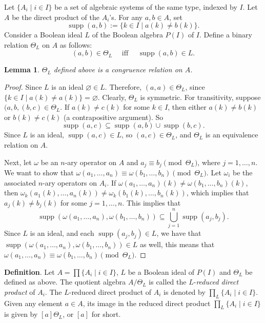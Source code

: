 \documentclass[12pt]{article}
\newtheorem{lem}{Lemma}
\begin{document}
Let $\lbrace A_i\mid i\in I\rbrace$ be a set of algebraic systems of the same type, indexed by $I$.  Let $A$ be the direct product of the $A_i$'s.  For any $a,b\in A$, set $$\operatorname{supp}(a,b):=\lbrace k\in I\mid a(k)\ne b(k)\rbrace.$$  Consider a Boolean ideal $L$ of the Boolean algebra $P(I)$ of $I$.  Define a binary relation $\Theta_L$ on $A$ as follows:
$$(a,b)\in \Theta_L\quad \mbox{ iff }\quad \operatorname{supp}(a,b)\in L.$$

\begin{lem} $\Theta_L$ defined above is a congruence relation on $A$. \end{lem}
\begin{proof}  Since $L$ is an ideal $\varnothing\in L$.  Therefore, $(a,a)\in \Theta_L$, since $\lbrace k\in I\mid a(k)\ne a(k)\rbrace=\varnothing$.  Clearly, $\Theta_L$ is symmetric.  For transitivity, suppose  $(a,b,(b,c)\in \Theta_L$.  If $a(k)\ne c(k)$ for some $k\in I$, then either $a(k)\ne b(k)$ or $b(k)\ne c(k)$ (a contrapositive argument).  So $$\operatorname{supp}(a,c) \subseteq \operatorname{supp}(a,b) \cup \operatorname{supp}(b,c).$$  Since $L$ is an ideal, $\operatorname{supp}(a,c)\in L$, so $(a,c)\in \Theta_L$, and $\Theta_L$ is an equivalence relation on $A$.

Next, let $\omega$ be an $n$-ary operator on $A$ and $a_j\equiv b_j\pmod {\Theta_L}$, where $j=1,\ldots,n$.  We want to show that $\omega(a_1,\ldots,a_n)\equiv \omega(b_1,\ldots,b_n)\pmod {\Theta_L}$.  Let $\omega_i$ be the associated $n$-ary operators on $A_i$.  If $\omega(a_1,\ldots,a_n)(k)\ne \omega(b_1,\ldots,b_n)(k)$, then $\omega_k(a_1(k),\ldots,a_n(k))\ne \omega_k(b_1(k),\ldots,b_n(k))$, which implies that $a_j(k)\ne b_j(k)$ for some $j=1,\ldots,n$.  This implies that $$\operatorname{supp}(\omega(a_1,\ldots,a_n),\omega(b_1,\ldots,b_n))\subseteq \bigcup_{j=1}^n \operatorname{supp}(a_j,b_j).$$
Since $L$ is an ideal, and each $\operatorname{supp}(a_j,b_j)\in L$, we have that $\operatorname{supp}(\omega(a_1,\ldots,a_n),\omega(b_1,\ldots,b_n))\in L$ as well, this means that $\omega(a_1,\ldots,a_n)\equiv \omega(b_1,\ldots,b_n)\pmod {\Theta_L}$.
\end{proof}

\textbf{Definition}.  Let $A=\prod \lbrace A_i\mid i\in I\rbrace$, $L$ be a Boolean ideal of $P(I)$ and $\Theta_L$ be defined as above.  The quotient algebra $A/\Theta_L$ is called the $L$-\emph{reduced direct product} of $A_i$.  The $L$-reduced direct product of $A_i$ is denoted by $\prod_L \lbrace A_i\mid i\in I\rbrace$.  Given any element $a\in A$, its image in the reduced direct product $\prod_L \lbrace A_i\mid i\in I\rbrace$ is given by $[a]\Theta_L$, or $[a]$ for short.
\end{document}

